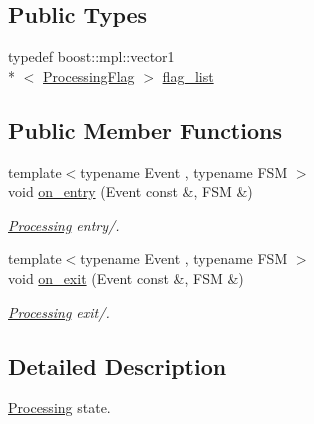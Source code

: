 \subsection*{Public Types}
\begin{DoxyCompactItemize}
\item 
typedef boost\-::mpl\-::vector1\\*
$<$ \hyperlink{structmdt_usbtmc_transfer_handler_state_machine_1_1_processing_flag}{Processing\-Flag} $>$ \hyperlink{structmdt_usbtmc_transfer_handler_state_machine_1_1_running___1_1_processing_a49b7c2a4db6a869b0214c7451b1369b2}{flag\-\_\-list}
\end{DoxyCompactItemize}
\subsection*{Public Member Functions}
\begin{DoxyCompactItemize}
\item 
{\footnotesize template$<$typename Event , typename F\-S\-M $>$ }\\void \hyperlink{structmdt_usbtmc_transfer_handler_state_machine_1_1_running___1_1_processing_a3b09d428f7eb255444d5aadfde93260d}{on\-\_\-entry} (Event const \&, F\-S\-M \&)
\begin{DoxyCompactList}\small\item\em \hyperlink{structmdt_usbtmc_transfer_handler_state_machine_1_1_running___1_1_processing}{Processing} entry/. \end{DoxyCompactList}\item 
{\footnotesize template$<$typename Event , typename F\-S\-M $>$ }\\void \hyperlink{structmdt_usbtmc_transfer_handler_state_machine_1_1_running___1_1_processing_a638aad8f2dccd77e52d156035d83387d}{on\-\_\-exit} (Event const \&, F\-S\-M \&)
\begin{DoxyCompactList}\small\item\em \hyperlink{structmdt_usbtmc_transfer_handler_state_machine_1_1_running___1_1_processing}{Processing} exit/. \end{DoxyCompactList}\end{DoxyCompactItemize}


\subsection{Detailed Description}
\hyperlink{structmdt_usbtmc_transfer_handler_state_machine_1_1_running___1_1_processing}{Processing} state. 

